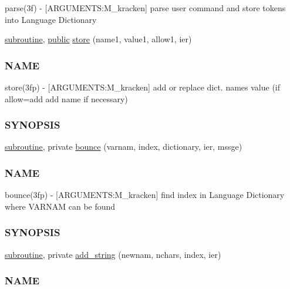 \begin{DoxyCompactItemize}
\begin{DoxyCompactList}
parse(3f) -\/ \mbox{[}A\+R\+G\+U\+M\+E\+N\+TS\+:M\+\_\+kracken\mbox{]} parse user command and store tokens into Language Dictionary \end{DoxyCompactList}\item 
\hyperlink{M__stopwatch_83_8txt_acfbcff50169d691ff02d4a123ed70482}{subroutine}, \hyperlink{M__stopwatch_83_8txt_a2f74811300c361e53b430611a7d1769f}{public} \hyperlink{namespacem__kracken_a6eb597e3ca7d161933f595788d511fd7}{store} (name1, value1, allow1, ier)
\begin{DoxyCompactList}\small\item\em \subsubsection*{N\+A\+ME}

store(3fp) -\/ \mbox{[}A\+R\+G\+U\+M\+E\+N\+TS\+:M\+\_\+kracken\mbox{]} add or replace dict. name\textquotesingle{}s value (if allow=\textquotesingle{}add\textquotesingle{} add name if necessary) \subsubsection*{S\+Y\+N\+O\+P\+S\+IS}\end{DoxyCompactList}\item 
\hyperlink{M__stopwatch_83_8txt_acfbcff50169d691ff02d4a123ed70482}{subroutine}, private \hyperlink{namespacem__kracken_af9225957a50e8e0559605911c4c5ee02}{bounce} (varnam, index, dictionary, ier, mssge)
\begin{DoxyCompactList}\small\item\em \subsubsection*{N\+A\+ME}

bounce(3fp) -\/ \mbox{[}A\+R\+G\+U\+M\+E\+N\+TS\+:M\+\_\+kracken\mbox{]} find index in Language Dictionary where V\+A\+R\+N\+AM can be found \subsubsection*{S\+Y\+N\+O\+P\+S\+IS}\end{DoxyCompactList}\item 
\hyperlink{M__stopwatch_83_8txt_acfbcff50169d691ff02d4a123ed70482}{subroutine}, private \hyperlink{namespacem__kracken_a21998bf9ab683f8fb661f4f4b916c21f}{add\+\_\+string} (newnam, nchars, index, ier)
\begin{DoxyCompactList}\small\item\em \subsubsection*{N\+A\+ME}


\end{DoxyCompactList}
\end{DoxyCompactItemize}
